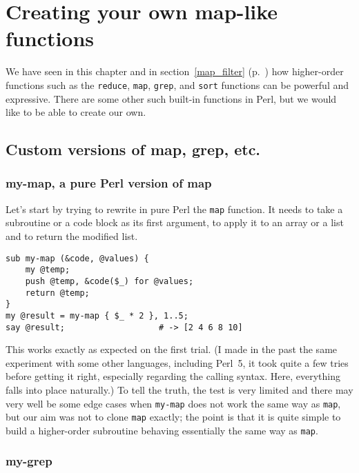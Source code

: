 \section{Creating your own map-like functions}
 
We have seen in this chapter and in 
section~\ref{map_filter} (p.~\pageref{map_filter}) 
how higher-order functions such as the {\tt reduce}, 
{\tt map}, {\tt grep}, and {\tt sort} functions 
can be powerful and expressive. There are some 
other such built-in functions in Perl, but we would 
like to be able to create our own.

\subsection{Custom versions of map, grep, etc.}

\subsubsection{my-map, a pure Perl version of map}

Let's start by trying to rewrite in pure Perl the 
{\tt map} function. It needs to take a subroutine 
or a code block as its first argument, to apply it 
to an array or a list and to return the modified 
list.

\begin{verbatim}
sub my-map (&code, @values) { 
    my @temp;
    push @temp, &code($_) for @values;
    return @temp;
}
my @result = my-map { $_ * 2 }, 1..5; 
say @result;                   # -> [2 4 6 8 10]
\end{verbatim}

This works exactly as expected on the first trial. 
(I made in the past the same experiment with some 
other languages, including Perl~5, it took quite 
a few tries before getting it right, especially 
regarding the calling syntax. Here, everything 
falls into place naturally.) To tell the truth, 
the test is very limited and there may very well be 
some edge cases when {\tt my-map} does not work 
the same way as {\tt map}, but our aim was not to 
clone {\tt map} exactly; the point is that it is 
quite simple to build a higher-order subroutine 
behaving essentially the same way as {\tt map}. 

\subsubsection{my-grep}

